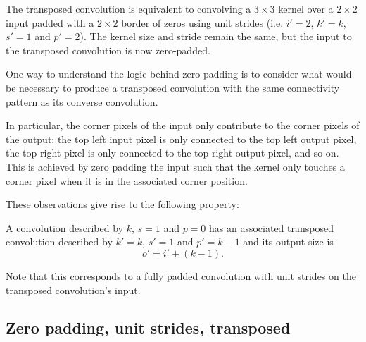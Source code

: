 \documentclass{article}
\begin{document}
The transposed convolution is equivalent to convolving a $3 \times 3$ kernel
over a $2 \times 2$ input padded with a $2 \times 2$ border of zeros using unit
strides (i.e. $i' = 2$, $k' = k$, $s' = 1$ and $p' = 2$). The kernel size and
stride remain the same, but the input to the transposed convolution is now
zero-padded.

One way to understand the logic behind zero padding is to consider what would be
necessary to produce a transposed convolution with the same connectivity pattern
as its converse convolution.

In particular, the corner pixels of the input only contribute to the corner
pixels of the output: the top left input pixel is only connected to the top left
output pixel, the top right pixel is only connected to the top right output
pixel, and so on. This is achieved by zero padding the input such that the
kernel only touches a corner pixel when it is in the associated corner position.

These observations give rise to the following property:

\begin{prop}\label{prop:no_padding_no_strides_transposed}
A convolution described by $k$, $s = 1$ and $p = 0$ has an associated transposed
convolution described by $k' = k$, $s' = 1$ and $p' = k - 1$ and its output size
is
\begin{equation*}
    o' = i' + (k - 1).
\end{equation*}
\end{prop}

Note that this corresponds to a fully padded convolution with unit strides on
the transposed convolution's input.

\subsection{Zero padding, unit strides, transposed}
\end{document}
